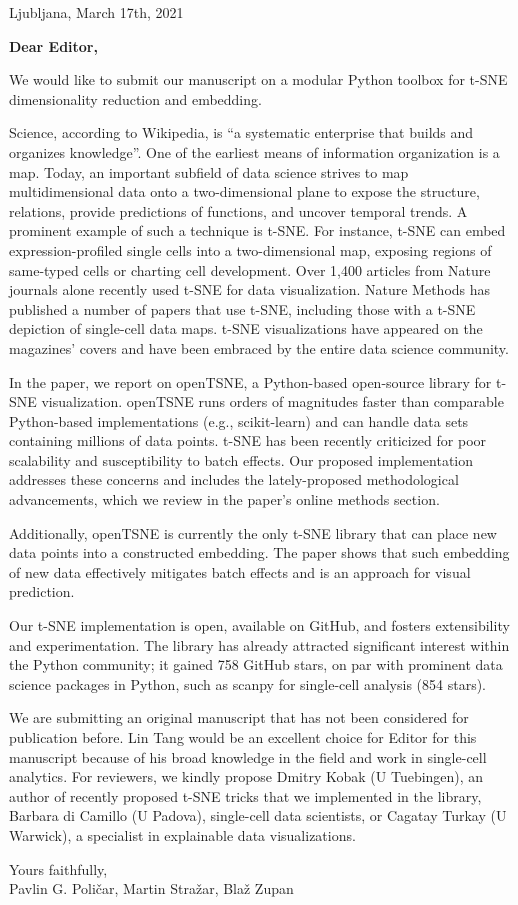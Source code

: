 \documentclass[11pt]{article}
\begin{document}
\begin{flushright}
Ljubljana, March 17th, 2021
\end{flushright}

\begin{flushleft}
{\bf Dear Editor,}

We would like to submit our manuscript on a modular Python toolbox for t-SNE dimensionality reduction and embedding.

Science, according to Wikipedia, is ``a systematic enterprise that builds and organizes knowledge''. One of the earliest means of information organization is a map. Today, an important subfield of data science strives to map multidimensional data onto a two-dimensional plane to expose the structure, relations, provide predictions of functions, and uncover temporal trends. A prominent example of such a technique is t-SNE. For instance, t-SNE can embed expression-profiled single cells into a two-dimensional map, exposing regions of same-typed cells or charting cell development. Over 1,400 articles from Nature journals alone recently used t-SNE for data visualization. Nature Methods has published a number of papers that use t-SNE, including those with a t-SNE depiction of single-cell data maps. t-SNE visualizations have appeared on the magazines' covers and have been embraced by the entire data science community.

In the paper, we report on openTSNE, a Python-based open-source library for t-SNE visualization. openTSNE runs orders of magnitudes faster than comparable Python-based implementations (e.g., scikit-learn) and can handle data sets containing millions of data points. t-SNE has been recently criticized for poor scalability and susceptibility to batch effects. Our proposed implementation addresses these concerns and includes the lately-proposed methodological advancements, which we review in the paper's online methods section.

Additionally, openTSNE is currently the only t-SNE library that can place new data points into a constructed embedding. The paper shows that such embedding of new data effectively mitigates batch effects and is an approach for visual prediction.

Our t-SNE implementation is open, available on GitHub, and fosters extensibility and experimentation. The library has already attracted significant interest within the Python community; it gained 758 GitHub stars, on par with prominent data science packages in Python, such as scanpy for single-cell analysis (854 stars).

We are submitting an original manuscript that has not been considered for publication before. Lin Tang would be an excellent choice for Editor for this manuscript because of his broad knowledge in the field and work in single-cell analytics. For reviewers, we kindly propose Dmitry Kobak (U Tuebingen), an author of recently proposed t-SNE tricks that we implemented in the library, Barbara di Camillo (U Padova), single-cell data scientists, or Cagatay Turkay (U Warwick), a specialist in explainable data visualizations. 

Yours faithfully, \\
Pavlin G. Poličar, Martin Stražar, Blaž Zupan
\end{flushleft}
\end{document}
